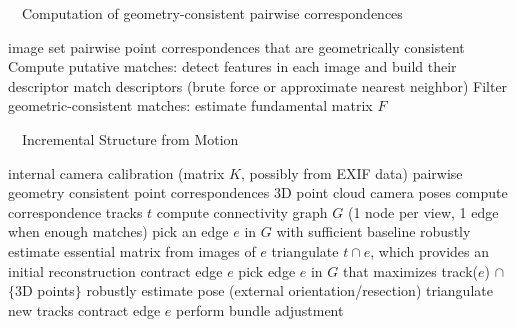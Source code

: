 \documentclass[11pt, letterpaper]{report}
\begin{document}
\begin{algorithm}
\caption{~~Computation of geometry-consistent pairwise correspondences}
\begin{algorithmic}\label{algo:corresp} 
\REQUIRE image set
\ENSURE  pairwise point correspondences that are geometrically consistent
\STATE Compute putative matches:
\STATE \quad detect features in each image and build their descriptor
\STATE \quad match descriptors (brute force or approximate nearest neighbor)
\STATE Filter geometric-consistent matches:
\STATE \quad \mbox{}\llap{$*$~~\quad}estimate fundamental matrix $F$
\end{algorithmic}
\end{algorithm}

\begin{algorithm}
\caption{~~Incremental Structure from Motion}
\begin{algorithmic}\label{algo:incremsfm}
\REQUIRE internal camera calibration (matrix $K$, possibly from EXIF data)
\REQUIRE pairwise geometry consistent point correspondences
\ENSURE 3D point cloud
\ENSURE camera poses
\STATE compute correspondence tracks $t$
\STATE compute connectivity graph $G$ (1 node per view, 1 edge when enough matches)
\STATE pick an edge $e$ in $G$ with sufficient baseline
\STATE \mbox{}\llap{$*$~~}robustly estimate essential matrix from images of $e$
\STATE triangulate $t \cap e$, which provides an initial reconstruction
\STATE contract edge $e$
\STATE pick edge $e$ in $G$ that maximizes track($e$) \(\cap\) $\{$3D points$\}$
\STATE \mbox{}\llap{$*$~~$\quad$}robustly estimate pose (external orientation/resection)
\STATE triangulate new tracks
\STATE contract edge $e$
\STATE perform bundle adjustment
\ENDWHILE
\end{algorithmic}
\end{algorithm}

\newpage
\end{document}
